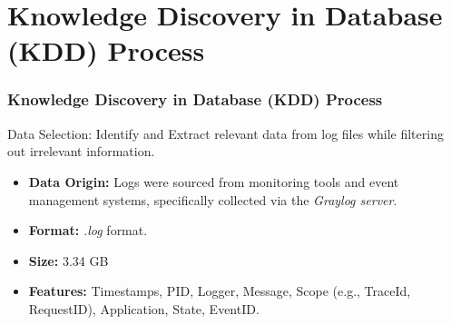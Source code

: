 \documentclass[10pt, a4paper]{beamer}
\begin{document}
	\section{Knowledge Discovery in Database (KDD) Process}
	\begin{frame}
		\frametitle{Knowledge Discovery in Database (KDD) Process}
		\begin{block}{Data Selection:}
			Identify and Extract relevant data from log files while filtering out irrelevant information.
			\begin{itemize}
				\item \textbf{Data Origin:} Logs were sourced from monitoring tools and event management systems, specifically collected via the \textit{Graylog server}.
				\item \textbf{Format:} \textit{.log} format.
				\item \textbf{Size:} 3.34 GB
				\item \textbf{Features:} Timestamps, PID, Logger, Message, Scope (e.g., TraceId, RequestID), Application, State, EventID.
			\end{itemize}
		\end{block}
	\end{frame}
	
\end{document}
